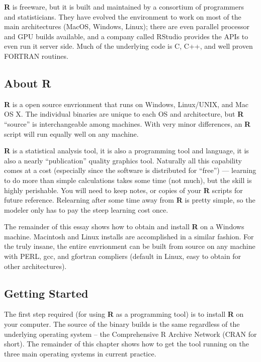  \textbf{R} is freeware, but it is built and maintained by a consortium of programmers and statisticians.  They have evolved the environment to work on most of the main architectures (MacOS, Windows, Linux); there are even parallel processor and GPU builds available, and a company called RStudio provides the APIs to even run it server side.  Much of the underlying code is C, C++, and well proven FORTRAN routines.
\subsection{About \textbf{R}}
\textbf{R} is a open source envrionment that runs on Windows, Linux/UNIX, and Mac OS X.  The individual binaries are unique to each OS and architecture, but \textbf{R} ``source'' is interchangeable among machines.  With very minor differences, an \textbf{R} script will run equally well on any machine.

\textbf{R} is a statistical analysis tool, it is also a programming tool and language, it is also a nearly ``publication'' quality graphics tool.  Naturally all this capability comes at a cost (especially since the software is distributed for ``free'') --- learning to do more than simple calculations takes some time (not much), but the skill is highly perishable.  You will need to keep notes, or copies of your \textbf{R} scripts for future reference.  Relearning after some time away from \textbf{R} is pretty simple, so the modeler only has to pay the steep learning cost once.

The remainder of this essay shows how to obtain and install \textbf{R} on a Windows machine.  Macintosh and Linux installs are accomplished in a similar fashion.  For the truly insane, the entire envrionment can be built from source on any machine with PERL, gcc, and gfortran compliers (default in Linux, easy to obtain for other architectures).

\subsection{Getting Started}
The first step required (for using \textbf{R} as a programming tool) is to install \textbf{R} on your computer.
The source of the binary builds is the same regardless of the underlying operating system -- the Comprehensive R Archive Network (CRAN for short).
The remainder of this chapter shows how to get the tool running on the three main operating systems in current practice.
